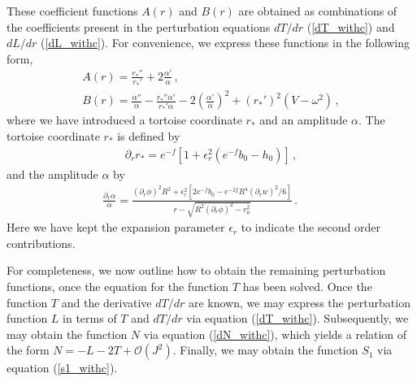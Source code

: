 \documentclass[aps,prd,12pt,superscriptaddress]{revtex4-2}
\begin{document}
These coefficient functions $A(r)$ and $B(r)$ are obtained as combinations of the coefficients present in the perturbation equations $dT/dr$ (\ref{dT_withc}) and $dL/dr$ (\ref{dL_withc}). 
For convenience, we express these functions in the following form,
\begin{eqnarray}
    A(r) = \frac{r_*'' }{r_*'}+2\frac{\alpha'}{\alpha} \, , \\
    B(r) = \frac{\alpha'' }{\alpha}-\frac{r_*''\alpha' }{r_*'\alpha}-2\left(\frac{\alpha'}{\alpha}\right)^2+(r_*' )^2 (V-\omega^2)  \, ,
\end{eqnarray}
where we have introduced a tortoise coordinate $r_*$ and an amplitude $\alpha$.
The tortoise coordinate $r_*$ is defined by
\begin{eqnarray}
\label{tor_coord}
   \partial_r r_*
   = e^{-f}
   \left[
   1 +
   \epsilon_r^2 (e^{-f}b_0-h_0)
   \right] \, ,   
 \end{eqnarray}  
and the amplitude $\alpha$ by
\begin{eqnarray}
   \frac{\partial_r\alpha}{\alpha}
   = \frac{(\partial_r\phi)^2R^2
   +\epsilon_r^2
   [
   2e^{-f}b_0
   -
   e^{-2f}R^4(\partial_r w)^2/6
   ]
   }{r-\sqrt{R^2(\partial_r\phi)^2-r_0^2}}
   \, .  \, \, \, \, \, \, \, \, \, \, \, \, 
\end{eqnarray}
Here we have kept the expansion parameter $\epsilon_r$ to indicate the second order contributions. 


 
For completeness, we now outline how to obtain the remaining perturbation functions, once the equation for the function $T$ has been solved.
Once the function $T$ and the derivative $dT/dr$ are known, we may express the perturbation function $L$ in terms of $T$ and $dT/dr$ via equation (\ref{dT_withc}).
Subsequently, we may obtain the function $N$ via equation (\ref{dN_withc}), which yields a relation of the form $N=-L-2T+\mathcal{O}(J^2)$.
Finally, we may obtain the function $S_1$ via equation (\ref{s1_withc}). 
\end{document}
